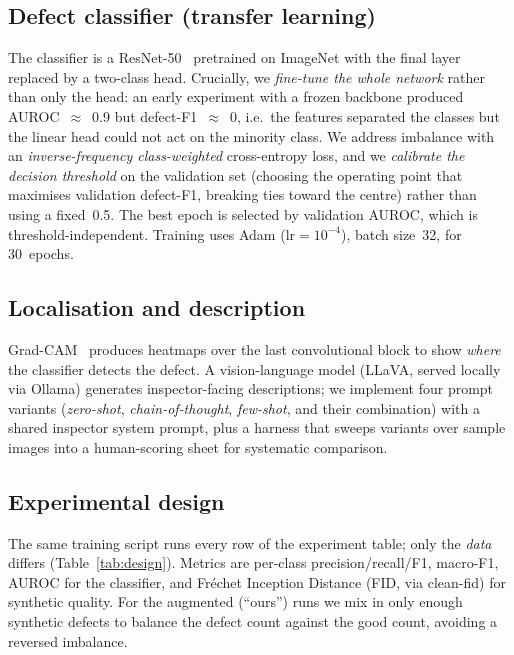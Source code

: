 \documentclass[11pt]{article}
\begin{document}
\subsection{Defect classifier (transfer learning)}
The classifier is a ResNet-50~\cite{he2016resnet} pretrained on ImageNet with the
final layer replaced by a two-class head. Crucially, we \emph{fine-tune the whole
network} rather than only the head: an early experiment with a frozen backbone
produced AUROC~$\approx$~0.9 but defect-F1~$\approx$~0, i.e.\ the features
separated the classes but the linear head could not act on the minority class.
We address imbalance with an \emph{inverse-frequency class-weighted}
cross-entropy loss, and we \emph{calibrate the decision threshold} on the
validation set (choosing the operating point that maximises validation defect-F1,
breaking ties toward the centre) rather than using a fixed~0.5. The best epoch is
selected by validation AUROC, which is threshold-independent. Training uses Adam
($\text{lr}=10^{-4}$), batch size~32, for 30~epochs.

\subsection{Localisation and description}
Grad-CAM~\cite{selvaraju2017gradcam} produces heatmaps over the last
convolutional block to show \emph{where} the classifier detects the defect. A
vision-language model (LLaVA, served locally via Ollama) generates
inspector-facing descriptions; we implement four prompt variants
(\textit{zero-shot}, \textit{chain-of-thought}, \textit{few-shot}, and their
combination) with a shared inspector system prompt, plus a harness that sweeps
variants over sample images into a human-scoring sheet for systematic comparison.

\subsection{Experimental design}
The same training script runs every row of the experiment table; only the
\emph{data} differs (Table~\ref{tab:design}). Metrics are per-class
precision/recall/F1, macro-F1, AUROC for the classifier, and Fr\'echet Inception
Distance (FID, via clean-fid) for synthetic quality. For the augmented (``ours'')
runs we mix in only enough synthetic defects to balance the defect count against
the good count, avoiding a reversed imbalance.
\end{document}
